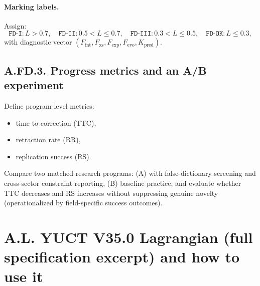 \documentclass[13pt,a4paper]{article}
\newcommand{\Kpred}{K_{\mathrm{pred}}}
\begin{document}
	\paragraph{Marking labels.}
	Assign:
	\[
	\texttt{FD-I}: L>0.7,\quad
	\texttt{FD-II}: 0.5<L\le0.7,\quad
	\texttt{FD-III}: 0.3<L\le0.5,\quad
	\texttt{FD-OK}: L\le0.3,
	\]
	with diagnostic vector $(F_{\mathrm{int}},F_{\mathrm{xs}},F_{\mathrm{exp}},F_{\mathrm{evo}},\Kpred)$.
	
	\subsection*{A.FD.3. Progress metrics and an A/B experiment}
	Define program-level metrics:
	\begin{itemize}[leftmargin=*]
		\item time-to-correction (TTC),
		\item retraction rate (RR),
		\item replication success (RS).
	\end{itemize}
	Compare two matched research programs: (A) with false-dictionary screening and cross-sector constraint reporting, (B) baseline practice, and evaluate whether TTC decreases and RS increases without suppressing genuine novelty (operationalized by field-specific success outcomes).
	
	\section*{A.L. YUCT V35.0 Lagrangian (full specification excerpt) and how to use it}
	
\end{document}
